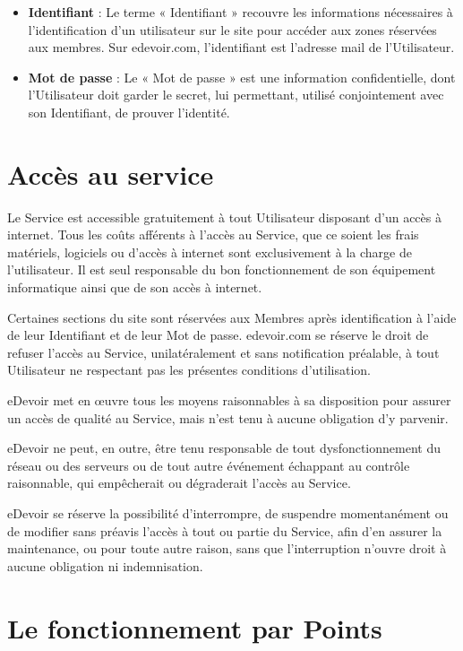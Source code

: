 \begin{itemize}
  \item \textbf{Identifiant} : Le terme « Identifiant » recouvre les informations nécessaires à l'identification d'un utilisateur sur le site pour accéder aux zones réservées aux membres. Sur edevoir.com, l'identifiant est l'adresse mail de l'Utilisateur.

  \item \textbf{Mot de passe} : Le « Mot de passe » est une information confidentielle, dont l'Utilisateur doit garder le secret, lui permettant, utilisé conjointement avec son Identifiant, de prouver l'identité.
\end{itemize}


\section{Accès au service}

Le Service est accessible gratuitement à tout Utilisateur disposant d'un accès à internet. Tous les coûts afférents à l'accès au Service, que ce soient les frais matériels, logiciels ou d'accès à internet sont exclusivement à la charge de l'utilisateur. Il est seul responsable du bon fonctionnement de son équipement informatique ainsi que de son accès à internet.

Certaines sections du site sont réservées aux Membres après identification à l'aide de leur Identifiant et de leur Mot de passe.
edevoir.com se réserve le droit de refuser l'accès au Service, unilatéralement et sans notification préalable, à tout Utilisateur ne respectant pas les présentes conditions d'utilisation.

eDevoir met en œuvre tous les moyens raisonnables à sa disposition pour assurer un accès de qualité au Service, mais n'est tenu à aucune obligation d'y parvenir.

eDevoir ne peut, en outre, être tenu responsable de tout dysfonctionnement du réseau ou des serveurs ou de tout autre événement échappant au contrôle raisonnable, qui empêcherait ou dégraderait l'accès au Service.

eDevoir se réserve la possibilité d'interrompre, de suspendre momentanément ou de modifier sans préavis l'accès à tout ou partie du Service, afin d'en assurer la maintenance, ou pour toute autre raison, sans que l'interruption n'ouvre droit à aucune obligation ni indemnisation.


\section{Le fonctionnement par Points}

